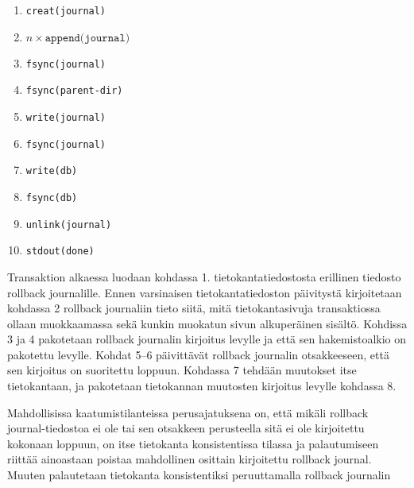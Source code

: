 \begin{enumerate}
    \item{\texttt{creat(journal)}}
    \item{$n \times \texttt{append(journal)}$}
    \item{\texttt{fsync(journal)}}
    \item{\texttt{fsync(parent-dir)}}
    \item{\texttt{write(journal)}}
    \item{\texttt{fsync(journal)}}
    \item{\texttt{write(db)}}
    \item{\texttt{fsync(db)}}
    \item{\texttt{unlink(journal)}}
    \item{\texttt{stdout(done)}}
\end{enumerate}
%
Transaktion alkaessa luodaan kohdassa 1. tietokantatiedostosta erillinen tiedosto rollback journalille.
Ennen varsinaisen tietokantatiedoston päivitystä kirjoitetaan kohdassa 2 rollback journaliin tieto siitä,
mitä tietokantasivuja transaktiossa ollaan muokkaamassa sekä kunkin muokatun sivun alkuperäinen sisältö.
Kohdissa 3 ja 4 pakotetaan rollback journalin kirjoitus levylle ja että sen hakemistoalkio on pakotettu levylle.
Kohdat 5--6 päivittävät rollback journalin otsakkeeseen, että sen kirjoitus on suoritettu loppuun.
Kohdassa 7 tehdään muutokset itse tietokantaan, ja pakotetaan tietokannan muutosten kirjoitus levylle kohdassa 8.

Mahdollisissa kaatumistilanteissa perusajatuksena on,
että mikäli rollback journal-tiedostoa ei ole tai sen otsakkeen perusteella sitä ei ole kirjoitettu kokonaan loppuun,
on itse tietokanta konsistentissa tilassa ja palautumiseen riittää ainoastaan poistaa mahdollinen osittain kirjoitettu rollback journal.
Muuten palautetaan tietokanta konsistentiksi peruuttamalla rollback journalin 

